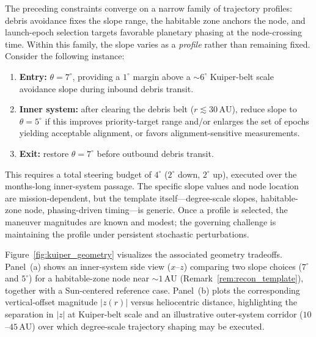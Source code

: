 \documentclass{article}
\begin{document}
The preceding constraints converge on a narrow family of trajectory profiles: debris avoidance fixes the slope range, the habitable zone anchors the node, and launch-epoch selection targets favorable planetary phasing at the node-crossing time. Within this family, the slope varies as a \emph{profile} rather than remaining fixed. Consider the following instance:
\begin{enumerate}
\item[\textup{(i)}] \textbf{Entry:} $\theta = 7^\circ$, providing a $1^\circ$ margin above a $\sim 6^\circ$ Kuiper-belt scale avoidance slope during inbound debris transit.
\item[\textup{(ii)}] \textbf{Inner system:} after clearing the debris belt ($r \lesssim 30\,\mathrm{AU}$), reduce slope to $\theta = 5^\circ$ if this improves priority-target range and/or enlarges the set of epochs yielding acceptable alignment, or favors alignment-sensitive measurements.
\item[\textup{(iii)}] \textbf{Exit:} restore $\theta = 7^\circ$ before outbound debris transit.
\end{enumerate}
This requires a total steering budget of $4^\circ$ ($2^\circ$ down, $2^\circ$ up), executed over the months-long inner-system passage. The specific slope values and node location are mission-dependent, but the template itself---degree-scale slopes, habitable-zone node, phasing-driven timing---is generic. Once a profile is selected, the maneuver magnitudes are known and modest; the governing challenge is maintaining the profile under persistent stochastic perturbations.

Figure~\ref{fig:kuiper_geometry} visualizes the associated geometry tradeoffs. Panel~(a) shows an inner-system side view ($x$--$z$) comparing two slope choices ($7^\circ$ and $5^\circ$) for a habitable-zone node near $\sim 1\,\mathrm{AU}$ (Remark~\ref{rem:recon_template}), together with a Sun-centered reference case. Panel~(b) plots the corresponding vertical-offset magnitude $|z(r)|$ versus heliocentric distance, highlighting the separation in $|z|$ at Kuiper-belt scale and an illustrative outer-system corridor ($10$--$45\,\mathrm{AU}$) over which degree-scale trajectory shaping may be executed.
\end{document}
